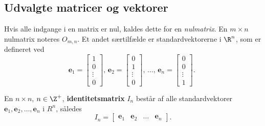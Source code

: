 \subsection{Udvalgte matricer og vektorer} 
% 
Hvis alle indgange i en matrix er nul, kaldes dette for en \textit{nulmatrix}. 
En $m \times n$ nulmatrix noteres $O_{m,n}$.
%
Et andet særtilfælde er standardvektorerne i $\R^n$, som er defineret ved  
%
$$
\textbf{e}_1=
\begin{bmatrix}
1 \\ 
0 \\ 
\vdots \\
0
\end{bmatrix}
\text{, }
\textbf{e}_2=
\begin{bmatrix}
0 \\ 
1 \\ 
\vdots \\
0
\end{bmatrix}
\text{, }
\ldots
\text{, }
\textbf{e}_n=
\begin{bmatrix}
0 \\ 
0 \\ 
\vdots \\
1
\end{bmatrix}
\text{. }
$$
%
\begin{defn}{}{}
%
En $n \times n$, $n \in \Z^+$, \textbf{identitetsmatrix} $I_n$ består af alle standardvektorer $\textbf{e}_1, \textbf{e}_2, \ldots, \textbf{e}_n$ i $R^n$, således 
$$
I_n=
\begin{bmatrix}
\textbf{e}_1 & \textbf{e}_2 & \ldots & \textbf{e}_n
\end{bmatrix}.
$$ 
\end{defn}
\noindent
%

